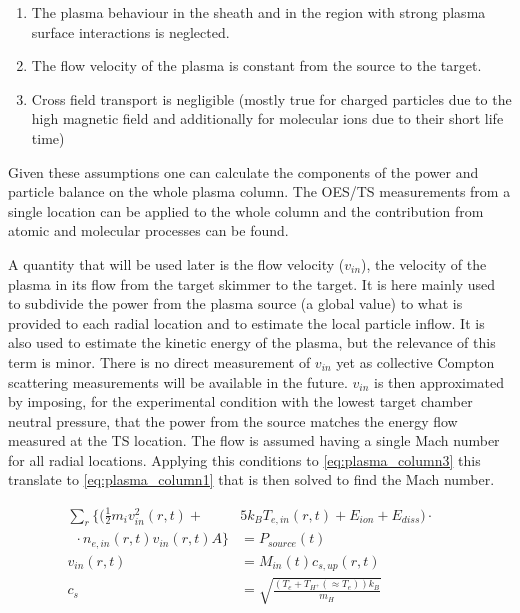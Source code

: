 \begin{enumerate}
    \item The plasma behaviour in the sheath and in the region with strong plasma surface interactions is neglected.
    \item The flow velocity of the plasma is constant from the source to the target.
    \item Cross field transport is negligible (mostly true for charged particles due to the high magnetic field and additionally for molecular ions due to their short life time)
\end{enumerate}

Given these assumptions one can calculate the components of the power and particle balance on the whole plasma column. The OES/TS measurements from a single location can be applied to the whole column and the contribution from atomic and molecular processes can be found.

A quantity that will be used later is the flow velocity ($v_{in}$), the velocity of the plasma in its flow from the target skimmer to the target. It is here mainly used to subdivide the power from the plasma source (a global value) to what is provided to each radial location and to estimate the local particle inflow. It is also used to estimate the kinetic energy of the plasma, but the relevance of this term is minor. There is no direct measurement of $v_{in}$ yet as collective Compton scattering measurements will be available in the future. $v_{in}$ is then approximated by imposing, for the experimental condition with the lowest target chamber neutral pressure, that the power from the source matches the energy flow measured at the TS location. The flow is assumed having a single Mach number for all radial locations. Applying this conditions to \autoref{eq:plasma_column3} this translate to \autoref{eq:plasma_column1} that is then solved to find the Mach number.


\begin{equation}
\label{eq:plasma_column1}
\begin{aligned}
\sum_{r} \biggl\{ \biggl(\frac{1}{2} m_i v_{in}^2(r,t) +
&%
5k_B T_{e,in}(r,t) + E_{ion} + E_{diss} \biggr) \cdot \phantom{\biggr\}} & \\ \phantom{\biggl\{} \cdot n_{e,in}(r,t) v_{in}(r,t)A \biggr\} &= P_{source}(t)
\\
v_{in}(r,t) &= M_{in}(t) c_{s,up}(r,t) \\  c_s &= \sqrt{\frac{ \left(T_e + T_{H^+{}}( {}\approx T_e) \right)k_B}{m_H} }
\end{aligned}
\end{equation}

